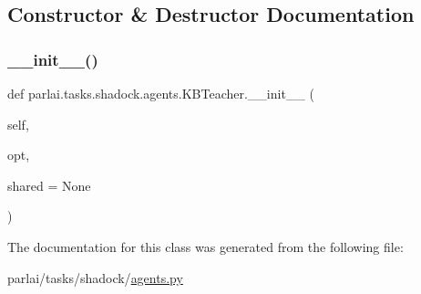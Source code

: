 \subsection{Constructor \& Destructor Documentation}
\mbox{\label{classparlai_1_1tasks_1_1shadock_1_1agents_1_1KBTeacher_a4d1a61f6ca5d3aeea18b629573ea382e}} 
\subsubsection{\texorpdfstring{\+\_\+\+\_\+init\+\_\+\+\_\+()}{\_\_init\_\_()}}
{\footnotesize\ttfamily def parlai.\+tasks.\+shadock.\+agents.\+K\+B\+Teacher.\+\_\+\+\_\+init\+\_\+\+\_\+ (\begin{DoxyParamCaption}\item[{}]{self,  }\item[{}]{opt,  }\item[{}]{shared = {\ttfamily None} }\end{DoxyParamCaption})}



The documentation for this class was generated from the following file\+:\begin{DoxyCompactItemize}
\item 
parlai/tasks/shadock/\hyperlink{parlai_2tasks_2shadock_2agents_8py}{agents.\+py}\end{DoxyCompactItemize}
